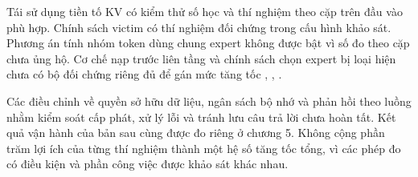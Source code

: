 Tái sử dụng tiền tố KV có kiểm thử số học và thí nghiệm theo cặp trên đầu vào phù hợp. Chính sách victim có thí nghiệm đối chứng trong cấu hình khảo sát. Phương án tính nhóm token dùng chung expert không được bật vì số đo theo cặp chưa ủng hộ. Cơ chế nạp trước liên tầng và chính sách chọn expert bị loại hiện chưa có bộ đối chứng riêng đủ để gán mức tăng tốc \cite{moe_tierengine_arch}, \cite{exp_web_session_i5}, \cite{exp_prefill_i5}.

Các điều chỉnh về quyền sở hữu dữ liệu, ngân sách bộ nhớ và phản hồi theo luồng nhằm kiểm soát cấp phát, xử lý lỗi và tránh lưu câu trả lời chưa hoàn tất. Kết quả vận hành của bản sau cùng được đo riêng ở chương 5. Không cộng phần trăm lợi ích của từng thí nghiệm thành một hệ số tăng tốc tổng, vì các phép đo có điều kiện và phần công việc được khảo sát khác nhau.